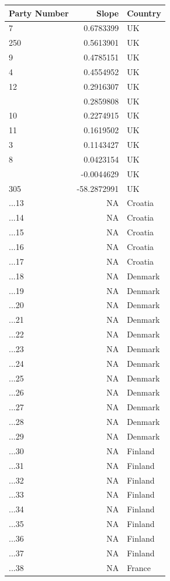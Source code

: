 
\begin{longtable}{lrl}
\toprule
Party Number & Slope & Country\\
\midrule
7 & 0.6783399 & UK\\
250 & 0.5613901 & UK\\
9 & 0.4785151 & UK\\
4 & 0.4554952 & UK\\
12 & 0.2916307 & UK\\
\addlinespace
2 & 0.2859808 & UK\\
10 & 0.2274915 & UK\\
11 & 0.1619502 & UK\\
3 & 0.1143427 & UK\\
8 & 0.0423154 & UK\\
\addlinespace
5 & -0.0044629 & UK\\
305 & -58.2872991 & UK\\
...13 & NA & Croatia\\
...14 & NA & Croatia\\
...15 & NA & Croatia\\
\addlinespace
...16 & NA & Croatia\\
...17 & NA & Croatia\\
...18 & NA & Denmark\\
...19 & NA & Denmark\\
...20 & NA & Denmark\\
\addlinespace
...21 & NA & Denmark\\
...22 & NA & Denmark\\
...23 & NA & Denmark\\
...24 & NA & Denmark\\
...25 & NA & Denmark\\
\addlinespace
...26 & NA & Denmark\\
...27 & NA & Denmark\\
...28 & NA & Denmark\\
...29 & NA & Denmark\\
...30 & NA & Finland\\
\addlinespace
...31 & NA & Finland\\
...32 & NA & Finland\\
...33 & NA & Finland\\
...34 & NA & Finland\\
...35 & NA & Finland\\
\addlinespace
...36 & NA & Finland\\
...37 & NA & Finland\\
...38 & NA & France\\

\end{longtable}
